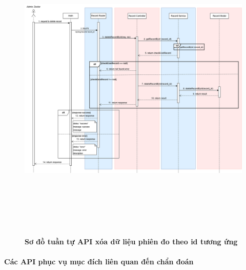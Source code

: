 \begin{figure}[H]
	\centering
	\includegraphics[width=15cm,height=15cm]{Images/api_sequence/record/deleteRecordByID.drawio.png}
	\caption[Sơ đồ tuần tự API xóa dữ liệu phiên đo theo id tương ứng]{\bfseries \fontsize{12pt}{0pt}\selectfont Sơ đồ tuần tự API xóa dữ liệu phiên đo theo id tương ứng}
	\label{sequence_diagram_delete_record}
\end{figure}
\paragraph{Các API phục vụ mục đích liên quan đến chẩn đoán}
\mbox{}

